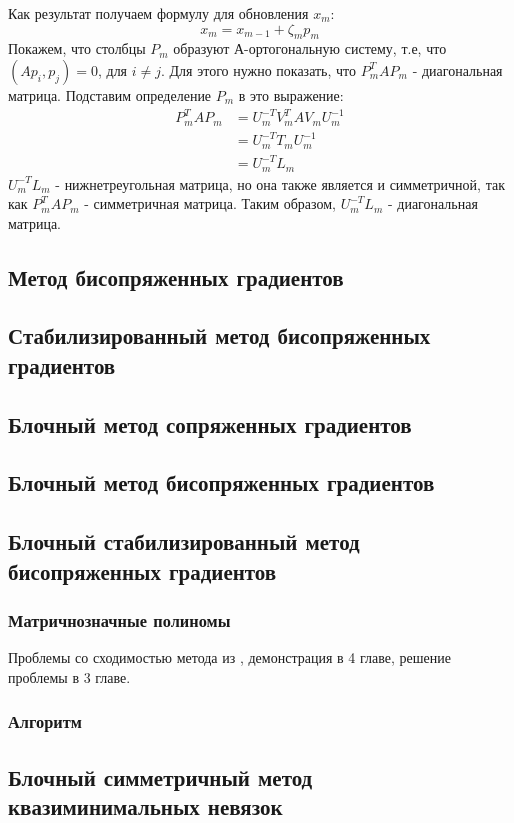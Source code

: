 Как результат получаем формулу для обновления $x_m$:
\begin{equation*}
    x_m = x_{m-1} + \zeta_m p_m
\end{equation*}
Покажем, что столбцы $P_m$ образуют А-ортогональную систему, т.е, что $(Ap_i,p_j) = 0$, для $i \neq j$.
Для этого нужно показать, что $P_m^T AP_m$ - диагональная матрица. Подставим определение $P_m$ в это выражение:
\begin{align}
    P_m^T AP_m &= U_m^{-T}V_m^T AV_m U_m^{-1} \\
               &= U_m^{-T}T_m U_m^{-1} \\
               &=U_m^{-T}L_m
\end{align}
$U_m^{-T}L_m$ - нижнетреугольная матрица, но она также является и симметричной, 
так как $P_m^T AP_m$ - симметричная матрица. Таким образом, $U_m^{-T}L_m$ - диагональная матрица.
\cite{Saad2003} 
\subsection{Метод бисопряженных градиентов}
\cite{Saad2003}
\subsection{Стабилизированный метод бисопряженных градиентов}
\cite{doi:10.1137/0913035}
\subsection{Блочный метод сопряженных градиентов}
\cite{OLEARY1980293}
\subsection{Блочный метод бисопряженных градиентов}
\cite{OLEARY1980293}
\subsection{Блочный стабилизированный метод бисопряженных градиентов}
\cite{elGuennouni2003}
\subsubsection{Матричнозначные полиномы}
 \par Проблемы со сходимостью метода из \cite{elGuennouni2003}, демонстрация в 4 главе, решение проблемы в 3 главе.
 \subsubsection{Алгоритм}
 \subsection{Блочный симметричный метод квазиминимальных невязок}


\newpage
